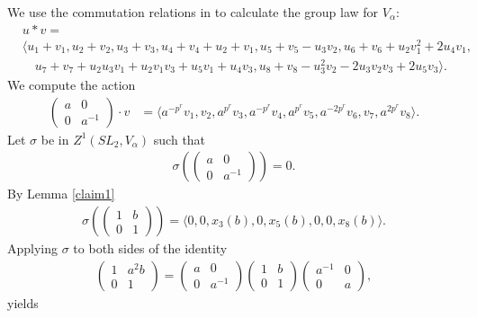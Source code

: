 We use the commutation relations in \cite[\S 33.3, \S 33.4]{humphreys1975linear} to calculate the group law for $V_\alpha$:
\begin{align*}
&u * v =\\
&\langle
u_1 + v_1,
u_2 + v_2,
u_3 + v_3,
u_4 + v_4 + u_2 + v_1,
u_5 + v_5 - u_3v_2,
u_6 + v_6 + u_2v_1^2 + 2u_4v_1,\\
&\quad u_7 + v_7 + u_2u_3v_1 + u_2v_1v_3 + u_5v_1 + u_4v_3,
u_8 + v_8 - u_3^2v_2 - 2u_3v_2v_3 + 2u_5v_3
\rangle.
\end{align*}
We compute the action
\begin{align*}
\left(\begin{matrix} a & 0 \\ 0 & a^{-1} \end{matrix}\right)\cdot v
&=
\langle 
a^{-p^r}v_1,
v_2,
a^{p^r}v_3,
a^{-p^r}v_4,
a^{p^r}v_5,
a^{-2p^r}v_6,
v_7,
a^{2p^r}v_8
\rangle.
\end{align*}
Let $\sigma$ be in $Z^1(SL_2, V_\alpha)$ such that
\begin{align}
\sigma\left(\left(\begin{matrix}a & 0\\0 & a^{-1}\end{matrix}\right)\right) = 0.
\end{align}
By Lemma \ref{claim1}
\begin{align}
\sigma\left(\left(\begin{matrix} 1 & b \\ 0 & 1 \end{matrix}\right)\right) =
\langle 
0,
0,
x_3(b),
0,
x_5(b),
0,
0,
x_8(b)
\rangle.
\end{align}
Applying $\sigma$ to both sides of the identity
\begin{align}
\left(\begin{matrix} 1 & a^2b \\ 0 & 1 \end{matrix}\right)
	= 
\left(\begin{matrix} a & 0 \\ 0 & a^{-1} \end{matrix}\right)
\left(\begin{matrix} 1 & b \\ 0 & 1 \end{matrix}\right)
	\left(\begin{matrix} a^{-1} & 0 \\ 0 & a \end{matrix}\right),
	\end{align}
	yields
